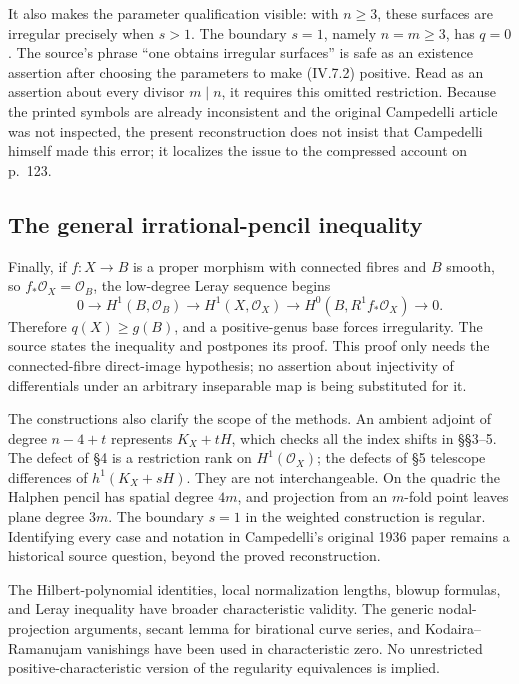 It also makes the parameter qualification visible: with \(n\geq3\), these surfaces are irregular precisely when \(s>1\). The boundary \(s=1\), namely \(n=m\geq3\), has \(q=0\). The source's phrase ``one obtains irregular surfaces'' is safe as an existence assertion after choosing the parameters to make (IV.7.2) positive. Read as an assertion about every divisor \(m\mid n\), it requires this omitted restriction. Because the printed symbols are already inconsistent and the original Campedelli article was not inspected, the present reconstruction does not insist that Campedelli himself made this error; it localizes the issue to the compressed account on p.~123.

\subsection{The general irrational-pencil inequality}

Finally, if \(f:X\to B\) is a proper morphism with connected fibres and \(B\) smooth, so \(f_*\mathcal O_X=\mathcal O_B\), the low-degree Leray sequence begins \[
 0\longrightarrow H^1(B,\mathcal O_B)
 \longrightarrow H^1(X,\mathcal O_X)
 \longrightarrow H^0(B,R^1f_*\mathcal O_X)\longrightarrow0.
\] Therefore \(q(X)\geq g(B)\), and a positive-genus base forces irregularity. The source states the inequality and postpones its proof. This proof only needs the connected-fibre direct-image hypothesis; no assertion about injectivity of differentials under an arbitrary inseparable map is being substituted for it.

The constructions also clarify the scope of the methods. An ambient adjoint of degree \(n-4+t\) represents \(K_X+tH\), which checks all the index shifts in §§3--5. The defect of §4 is a restriction rank on \(H^1(\mathcal O_X)\); the defects of §5 telescope differences of \(h^1(K_X+sH)\). They are not interchangeable. On the quadric the Halphen pencil has spatial degree \(4m\), and projection from an \(m\)-fold point leaves plane degree \(3m\). The boundary \(s=1\) in the weighted construction is regular. Identifying every case and notation in Campedelli's original 1936 paper remains a historical source question, beyond the proved reconstruction.

The Hilbert-polynomial identities, local normalization lengths, blowup formulas, and Leray inequality have broader characteristic validity. The generic nodal-projection arguments, secant lemma for birational curve series, and Kodaira--Ramanujam vanishings have been used in characteristic zero. No unrestricted positive-characteristic version of the regularity equivalences is implied.

